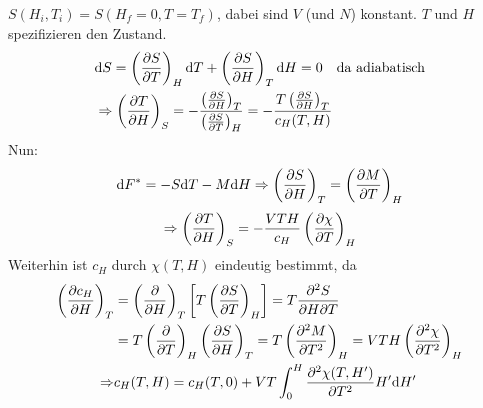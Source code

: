 $S(H_i, T_i) = S(H_f = 0, T = T_f)$, dabei sind $V$ (und $N$) konstant. $T$ und $H$ spezifizieren den Zustand.
\begin{equation}
    \begin{split}
        & \mathrm{d} S = \left( \frac{\partial S}{\partial T} \right)_{H} \mathrm{d} T + \left( \frac{\partial S}{\partial H} \right)_{T} \mathrm{d} H = 0 \quad \text{da adiabatisch}  \\
        & \Rightarrow \left( \frac{\partial T}{\partial H} \right)_{S} = - \frac{\left( \frac{\partial S}{\partial H} \right)_{T}}{\left( \frac{\partial S}{\partial T} \right)_{H}} = - \frac{T \left( \frac{\partial S}{\partial H} \right)_{T} }{c_H (T, H)}
    \end{split}
\end{equation}
Nun:
\begin{equation}
    \mathrm{d} F^* = - S \mathrm{d} T - M \mathrm{d} H \Rightarrow \left( \frac{\partial S}{\partial H} \right)_{T} = \left( \frac{\partial M}{\partial T} \right)_{H}
\end{equation}
\begin{equation}
    \Rightarrow \left( \frac{\partial T}{\partial H} \right)_{S} = - \frac{V T H}{c_H} \left( \frac{\partial \chi}{\partial T} \right)_{H}
\end{equation}
Weiterhin ist $c_H$ durch $\chi(T, H)$ eindeutig bestimmt, da
\begin{equation}
    \begin{split}
        \left( \frac{\partial c_H}{\partial H} \right)_{T} &= \left( \frac{\partial }{\partial H} \right)_{T} \left[ T \left( \frac{\partial S}{\partial T} \right)_{H} \right] = T \frac{\partial^2 S}{\partial H \partial T} \\
        &= T \left( \frac{\partial }{\partial T} \right)_{H} \left( \frac{\partial S}{\partial H} \right)_{T} = T \left( \frac{\partial^2 M}{\partial T^2} \right)_H	= V T H \left( \frac{\partial^2 \chi}{\partial T^2} \right)_H \\
       \Rightarrow & c_H(T, H) = c_H (T, 0) + V T \int_{0}^{H} \frac{\partial^2  \chi(T, H')}{\partial T^2} H' \mathrm{d} H'
    \end{split}
\end{equation}

